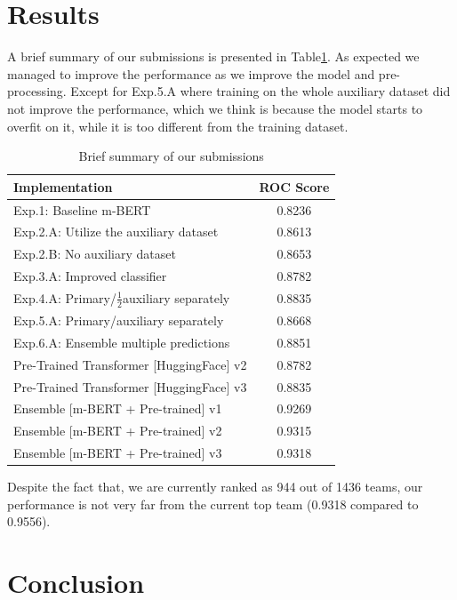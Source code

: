 \documentclass[10pt,twocolumn,letterpaper]{article}
\begin{document}
 
\section{Results}
A brief summary of our submissions is presented in Table\ref{ResultsSummary}. As expected we managed to improve the performance as we improve the model and pre-processing. Except for Exp.5.A where training on the whole auxiliary dataset did not  improve the performance, which we think is because the model starts to overfit on it, while it is too different from the training dataset. 

\begin{table}
\begin{center}
\begin{tabular}{|l|c|}
\hline
Implementation	& ROC Score \\
\hline\hline

Exp.1: Baseline m-BERT	& 0.8236    \\
Exp.2.A: Utilize the auxiliary dataset & 0.8613 \\
Exp.2.B: No auxiliary dataset	&0.8653 \\
Exp.3.A: Improved classifier & 0.8782 \\
Exp.4.A: Primary/$\frac{1}{2}$auxiliary separately & 0.8835 \\
Exp.5.A: Primary/auxiliary separately & 0.8668  \\
Exp.6.A: Ensemble multiple predictions & 0.8851 \\
Pre-Trained Transformer [HuggingFace] v2	&0.8782 \\
Pre-Trained Transformer [HuggingFace] v3	&0.8835  \\
Ensemble [m-BERT + Pre-trained] v1 	& 0.9269   \\
Ensemble [m-BERT + Pre-trained] v2 	& 0.9315   \\
Ensemble [m-BERT + Pre-trained] v3 	& 0.9318  \\

\hline
\end{tabular}
\end{center}
\caption{\label{ResultsSummary} Brief summary of our submissions}
\end{table}
Despite the fact that, we are currently ranked as 944 out of 1436 teams, our performance is not very far from the current top team (0.9318 compared to 0.9556). 

\section{Conclusion}
\end{document}
